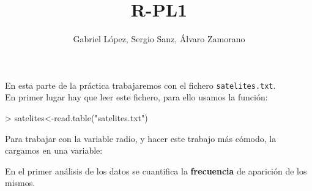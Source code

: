 \documentclass [a4paper] {article}
\title{R-PL1}
\author{Gabriel L\'opez, Sergio Sanz, \'Alvaro Zamorano}
\begin{document}
\maketitle

En esta parte de la pr\'actica trabajaremos con el fichero
\texttt{satelites.txt}.\\

\bigskip
En primer lugar hay que leer este fichero, para ello usamos
la funci\'on:
\begin{Schunk}
\begin{Sinput}
> satelites<-read.table("satelites.txt")
\end{Sinput}
\end{Schunk}

\bigskip
Para trabajar con la variable radio, y hacer este trabajo m\'as
c\'omodo, la cargamos en una variable:
\begin{Schunk}
\end{Schunk}

\bigskip
En el primer an\'alisis de los datos se cuantifica la \textbf{frecuencia}
de aparici\'on de los mismos. 
\end{document}
